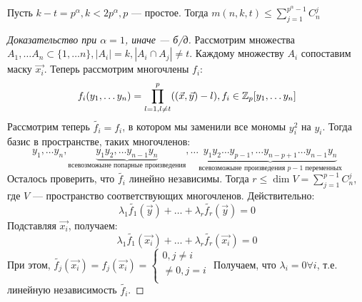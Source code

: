 \begin{theorem}
    Пусть \(k - t = p^\alpha, k < 2p^\alpha, p\) --- простое. Тогда \(m(n, k, t) \le \sum_{j = 1}^{p^\alpha - 1}C_n^j\)
\end{theorem}
\begin{proof}[Доказательство при \(\alpha = 1\), иначе --- б/д]
    Рассмотрим множества \(A_1, \dots A_n \subset \{1, \dots n\}, |A_i| = k, |A_i \cap A_j| \ne t\). Каждому множеству \(A_i\) сопоставим маску \(\vec{x_i}\). Теперь рассмотрим многочлены \(f_i\):
    \[f_i(y_1, \dots y_n) = \prod_{l = 1, l \ne t}^p ((\vec{x}, \vec{y}) - l), f_i \in \mathbb{Z}_p[y_1, \dots y_n]\]
    Рассмотрим теперь \(\tilde{f_i} = f_i\), в котором мы заменили все мономы \(y_i^2\) на \(y_i\). Тогда базис в пространстве, таких многочленов:
    \[y_1, \dots y_n, \underbrace{y_1y_2, \dots y_{n - 1}y_{n}}_{\text{всевозможыне попарные произведения}}, \dots \underbrace{y_1y_2\dots y_{p - 1}, \dots y_{n - p + 1}\dots y_{n - 1}y_{n}}_{\text{всевозможыне произведения \(p-1\) переменных}}\]
    Осталось проверить, что \(\tilde{f_i}\) линейно независимы. Тогда \(r \le \dim V = \sum_{j = 1}^{p - 1}C_n^j\), где \(V\) --- пространство соответствующих многочленов. Действительно:
    \[\lambda_1 \tilde{f_1}(\vec{y}) + \dots + \lambda_r \tilde{f_r}(\vec{y}) = 0\]
    Подставляя \(\vec{x_i}\), получаем:
    \[\lambda_1 \tilde{f_1}(\vec{x_i}) + \dots + \lambda_r \tilde{f_r}(\vec{x_i}) = 0\]
    При этом, \(\tilde{f_j}(\vec{x_i}) = f_j(\vec{x_i}) = \left\{\begin{array}{l}
        0, j \ne i \\
        \ne 0, j = i \\
    \end{array}\right.\)
    Получаем, что \(\lambda_i = 0 \forall i\), т.е. линейную независимость \(\tilde{f_i}\).
\end{proof}
